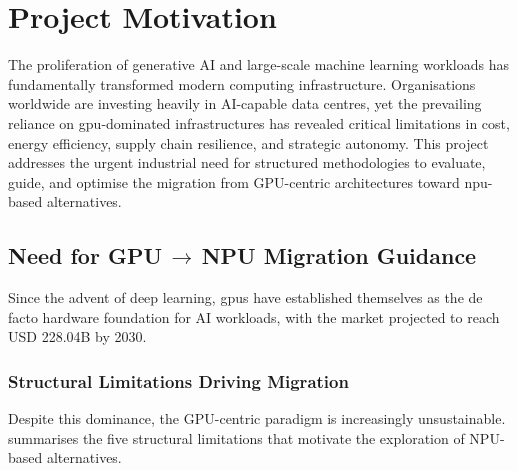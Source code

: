 
\section{Project Motivation}
\label{sec:project-motivation}

The proliferation of generative AI and large-scale machine learning workloads
has fundamentally transformed modern computing infrastructure. Organisations
worldwide are investing heavily in AI-capable data centres, yet the prevailing
reliance on \acrshort{gpu}-dominated infrastructures has revealed critical
limitations in cost, energy efficiency, supply chain resilience, and strategic
autonomy. This project addresses the urgent industrial need for structured
methodologies to evaluate, guide, and optimise the migration from GPU-centric
architectures toward \acrshort{npu}-based alternatives.

\subsection{Need for GPU\texorpdfstring{$\,\to\,$}{-to-}NPU Migration Guidance}
\label{subsec:migration-need}

Since the advent of deep learning, \acrfull{gpu}s have established themselves
as the de facto hardware foundation for AI workloads, with the market projected
to reach USD 228.04B by 2030.

\subsubsection{Structural Limitations Driving Migration}

Despite this dominance, the GPU-centric paradigm is increasingly
unsustainable.  summarises the five structural
limitations that motivate the exploration of NPU-based alternatives.

